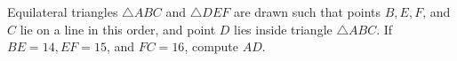 Equilateral triangles $\triangle A B C$ and $\triangle D E F$ are drawn such that points $B, E, F$, and $C$ lie on a line in this order, and point $D$ lies inside triangle $\triangle A B C$. If $B E=14, E F=15$, and $F C=16$, compute $A D$.